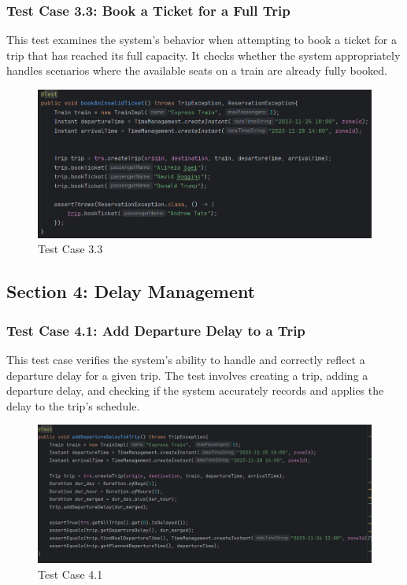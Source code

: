 \documentclass{article}
\begin{document}
\pagebreak

\subsubsection{Test Case 3.3: Book a Ticket for a Full Trip}

This test examines the system's behavior when attempting to book a ticket for a trip that has reached its full capacity. It checks whether the system appropriately handles scenarios where the available seats on a train are already fully booked.

\begin{figure}[h]
  \centering
  \includegraphics[width=1.0\textwidth]{pictures/T3-3.png}
  \caption{Test Case 3.3}
  \label{fig:your_label}
\end{figure}

\pagebreak

\subsection{Section 4: Delay Management}
\subsubsection{Test Case 4.1: Add Departure Delay to a Trip}

This test case verifies the system's ability to handle and correctly reflect a departure delay for a given trip. The test involves creating a trip, adding a departure delay, and checking if the system accurately records and applies the delay to the trip's schedule.

\begin{figure}[h]
  \centering
  \includegraphics[width=1.0\textwidth]{pictures/T4-1.png}
  \caption{Test Case 4.1}
  \label{fig:your_label}
\end{figure}
\end{document}
